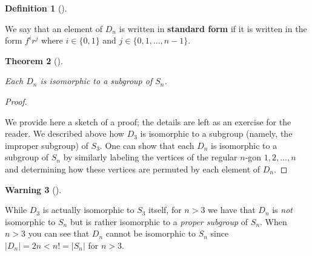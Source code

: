 \documentclass[10pt,]{book}
\newcommand{\terminology}[1]{\textbf{#1}}
\theoremstyle{plain}
\newtheorem{theorem}{Theorem}[section]
\theoremstyle{definition}
\newtheorem{definition}[theorem]{Definition}
\theoremstyle{definition}
\newtheorem{warning}[theorem]{Warning}
\theoremstyle{definition}
\theoremstyle{definition}
\numberwithin{equation}{section}
\newcommand{\lt}{ < }
\begin{document}
\begin{definition}[{}]\label{definition-52}

        We say that an element of \(D_n\) is written in \terminology{standard form} if it is written in the form \(f^ir^j\) where
        \(i\in \{0,1\}\) and \(j\in \{0,1,\ldots,n-1\}\).
\end{definition}
\begin{theorem}[{}]\label{theorem-39}

        Each \(D_n\) is isomorphic to a subgroup of \(S_n\).
\end{theorem}
\begin{proof}\hypertarget{proof-33}{}
 We provide here a sketch of a proof; the details are left as an exercise for the reader. We described above how \(D_3\) is isomorphic to a subgroup
    (namely, the improper subgroup) of \(S_3\). One can show that each \(D_n\) is isomorphic to a subgroup of \(S_n\) by similarly labeling the vertices of the regular \(n\)-gon \(1,2,\ldots, n\) and determining how these vertices are permuted by each element of \(D_n\).
\end{proof}
\begin{warning}[]\label{warning-19}

      While \(D_3\) is actually isomorphic to \(S_3\) itself, for \(n>3\) we have that \(D_n\) is \emph{not} isomorphic to \(S_n\) but is rather isomorphic to a \emph{proper subgroup} of \(S_n\). When \(n>3\) you can see that \(D_n\) cannot be isomorphic to \(S_n\) since \(|D_n|=2n \lt  n! = |S_n|\) for \(n>3\).
\end{warning}
\par
\end{document}
